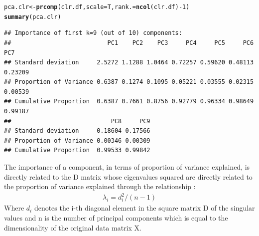 \documentclass[a4paper,oneside,12pt,titlepage]{article}\usepackage[]{graphicx}\usepackage[]{color}
\makeatletter
\newcommand{\hlnum}[1]{\textcolor[rgb]{0.686,0.059,0.569}{#1}}%
\newcommand{\hlopt}[1]{\textcolor[rgb]{0,0,0}{#1}}%
\newcommand{\hlstd}[1]{\textcolor[rgb]{0.345,0.345,0.345}{#1}}%
\newcommand{\hlkwb}[1]{\textcolor[rgb]{0.69,0.353,0.396}{#1}}%
\newcommand{\hlkwc}[1]{\textcolor[rgb]{0.333,0.667,0.333}{#1}}%
\newcommand{\hlkwd}[1]{\textcolor[rgb]{0.737,0.353,0.396}{\textbf{#1}}}%
\newenvironment{kframe}{%
 \def\at@end@of@kframe{}%
 \ifinner\ifhmode%
  \def\at@end@of@kframe{\end{minipage}}%
  \begin{minipage}{\columnwidth}%
 \fi\fi%
 \def\FrameCommand##1{\hskip\@totalleftmargin \hskip-\fboxsep
 \colorbox{shadecolor}{##1}\hskip-\fboxsep
     \hskip-\linewidth \hskip-\@totalleftmargin \hskip\columnwidth}%
 \MakeFramed {\advance\hsize-\width
   \@totalleftmargin\z@ \linewidth\hsize
   \@setminipage}}%
 {\par\unskip\endMakeFramed%
 \at@end@of@kframe}
\newenvironment{knitrout}{}{} %
\makeatother
\begin{document}
\begin{knitrout}
\color{fgcolor}\begin{kframe}
\begin{alltt}
\hlstd{pca.clr} \hlkwb{<-} \hlkwd{prcomp}\hlstd{(clr.df,}\hlkwc{scale} \hlstd{= T,}\hlkwc{rank.} \hlstd{=} \hlkwd{ncol}\hlstd{(clr.df)}\hlopt{-}\hlnum{1} \hlstd{)}
\hlkwd{summary}\hlstd{(pca.clr)}
\end{alltt}
\begin{verbatim}
## Importance of first k=9 (out of 10) components:
##                           PC1    PC2    PC3     PC4     PC5     PC6     PC7
## Standard deviation     2.5272 1.1288 1.0464 0.72257 0.59620 0.48113 0.23209
## Proportion of Variance 0.6387 0.1274 0.1095 0.05221 0.03555 0.02315 0.00539
## Cumulative Proportion  0.6387 0.7661 0.8756 0.92779 0.96334 0.98649 0.99187
##                            PC8     PC9
## Standard deviation     0.18604 0.17566
## Proportion of Variance 0.00346 0.00309
## Cumulative Proportion  0.99533 0.99842
\end{verbatim}
\end{kframe}
\end{knitrout}
The importance of a component, in terms of proportion of variance explained, is directly related to the D matrix whose eigenvalues squared are directly related to the proportion of variance explained through the relationship : 
\begin{align} \label{variancepca}
\lambda_i = d_i^2/(n-1)
\end{align}
Where $d_i$ denotes the i-th diagonal element in the square matrix D of the singular values and n is the number of principal components which is equal to the dimensionality of the original data matrix X.
\end{document}

